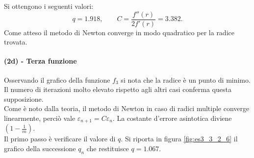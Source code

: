 \documentclass[letterpaper, 12pt]{article}
\numberwithin{equation}{section}    %
\begin{document}
Si ottengono i seguenti valori:
\begin{equation*}
    q = 1.918,
    \qquad
    C = \frac{ f''(r)}{2 f'(r)} = 3.382.
\end{equation*}
Come atteso il metodo di Newton converge in modo quadratico per la radice trovata.

\paragraph{(2d) - Terza funzione}
Osservando il grafico della funzione $f_3$ si nota che la radice è un punto di minimo. 
Il numero di iterazioni molto elevato rispetto agli altri casi conferma questa supposizione. \\
Come è noto dalla teoria, il metodo di Newton in caso di radici multiple converge linearmente, perciò vale
$ \varepsilon_{n+1} = C \varepsilon_n $. La costante d'errore asintotica diviene $(1-{\frac{1}{m}})$. \\
Il primo passo è verificare il valore di $q$. Si riporta in figura \ref{fig:es3_3_2_6} il grafico 
della successione $q_n$ che restituisce $q = 1.067$. \\
\end{document}
